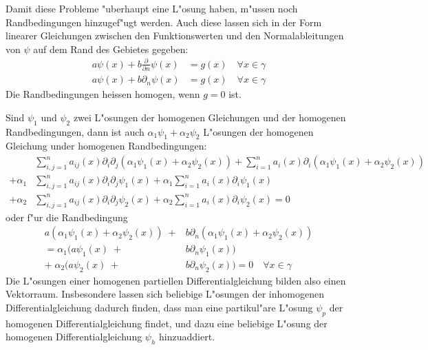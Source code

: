 Damit diese Probleme "uberhaupt eine L"osung haben, m"ussen noch 
Randbedingungen hinzugef"ugt werden.
Auch diese lassen sich in der Form linearer Gleichungen zwischen den 
Funktionswerten und den Normalableitungen von $\psi$ auf dem Rand des
Gebietes gegeben:
\begin{align*}
a\psi(x)+
b\frac{\partial}{\partial n}\psi(x)
&=g(x)\quad\forall x\in\gamma\\
a\psi(x)+b\partial_n\psi(x)&=g(x)\quad\forall x\in\gamma
\end{align*}
Die Randbedingungen heissen homogen, wenn $g=0$ ist.

Sind $\psi_1$ und $\psi_2$ zwei L"osungen der homogenen Gleichungen und der
homogenen Randbedingungen, dann ist auch $\alpha_1\psi_1+\alpha_2\psi_2$
L"osungen der homogenen Gleichung under homogenen Randbedingungen:
\begin{align*}
&\sum_{i,j=1}^n a_{ij}(x)\partial_i \partial_j
(\alpha_1\psi_1(x)+\alpha_2\psi_2(x))
+\sum_{i=1}^na_i(x)\partial_i
(\alpha_1\psi_1(x)+\alpha_2\psi_2(x))
\\
+
\alpha_1
&\sum_{i,j=1}^n a_{ij}(x)\partial_i \partial_j
\psi_1(x)
+
\alpha_1
\sum_{i=1}^na_i(x)\partial_i
\psi_1(x)
\\
+
\alpha_2
&\sum_{i,j=1}^n a_{ij}(x)\partial_i \partial_j
\psi_2(x)
+
\alpha_2
\sum_{i=1}^na_i(x)\partial_i
\psi_2(x)
=0
\end{align*}
oder f"ur die Randbedingung
\begin{align*}
a(\alpha_1\psi_1(x) +\alpha_2\psi_2(x))
\;+&b\partial_n
(\alpha_1\psi_1(x) +\alpha_2\psi_2(x))\\
=\alpha_1(a\psi_1(x)
\;+&b\partial_n
\psi_1(x))\\
+\;\alpha_2(a\psi_2(x)
\;+&b\partial_n
\psi_2(x))
=0\quad\forall x\in\gamma
\end{align*}
Die L"osungen einer homogenen partiellen Differentialgleichung
bilden also einen Vektorraum. Insbesondere lassen sich beliebige
L"osungen der inhomogenen Differentialgleichung dadurch finden, dass
man eine partikul"are L"osung $\psi_p$ der homogenen Differentialgleichung
findet, und dazu eine beliebige L"osung der homogenen Differentialgleichung
$\psi_h$ hinzuaddiert.

